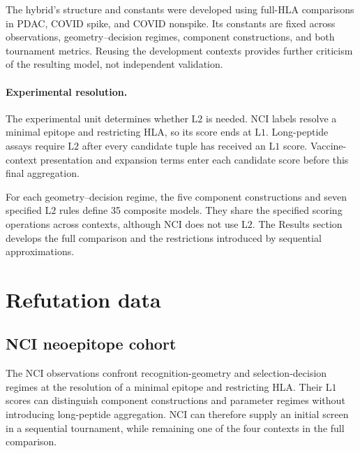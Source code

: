 \documentclass[11pt]{article}
\begin{document}
The hybrid's structure and constants were developed using full-HLA comparisons
in PDAC, COVID spike, and COVID nonspike. Its constants are fixed across
observations, geometry--decision regimes, component constructions, and both
tournament metrics. Reusing the development contexts provides further
criticism of the resulting model, not independent validation.

\paragraph{Experimental resolution.}

The experimental unit determines whether \(\mathrm{L2}\) is needed. NCI labels
resolve a minimal epitope and restricting HLA, so its score ends at
\(\mathrm{L1}\). Long-peptide assays require \(\mathrm{L2}\) after every
candidate tuple has received an \(\mathrm{L1}\) score. Vaccine-context
presentation and expansion terms enter each candidate score before this final
aggregation.

For each geometry--decision regime, the five component constructions and
seven specified \(\mathrm{L2}\) rules define 35 composite models. They share
the specified scoring operations across contexts, although NCI does not use
\(\mathrm{L2}\). The Results section develops the full comparison and the
restrictions introduced by sequential approximations.


\section{Refutation data}
\label{sec:data}

\subsection{NCI neoepitope cohort}

The NCI observations confront recognition-geometry and selection-decision
regimes at the resolution of a minimal epitope and restricting HLA. Their
\(\mathrm{L1}\) scores can distinguish component constructions and parameter
regimes without introducing long-peptide aggregation. NCI can therefore supply
an initial screen in a sequential tournament, while remaining one of the four
contexts in the full comparison.
\end{document}
